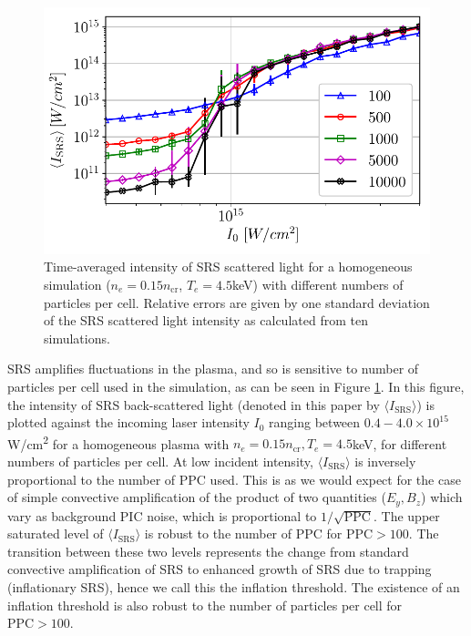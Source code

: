 \begin{figure}[ht]
 \centering
 \includegraphics[width=\columnwidth]{Chapters/C4_iSRS/fig1.pdf}
 \caption{Time-averaged intensity of SRS scattered light for a homogeneous simulation ($n_e=0.15n_\mathrm{cr}$, $T_e = 4.5$\si{\kilo \electronvolt}) with different numbers of particles
 per cell. Relative errors are given by one standard deviation of the SRS scattered light intensity as calculated from ten simulations.} \label{fig:convergence}
\end{figure}

SRS amplifies fluctuations in the plasma, and so is sensitive to number of particles per cell used in the simulation, as can be seen in Figure \ref{fig:convergence}.
In this figure, the intensity of SRS back-scattered light (denoted in this paper by $\langle I_{\mathrm{SRS}}\rangle$) is plotted against the incoming laser intensity $I_0$ ranging between
$0.4 - 4.0 \times 10^{15}$\si{W/\centi\metre^2} for a homogeneous plasma with $n_e=0.15n_\mathrm{cr}, T_e = 4.5$\si{\kilo \electronvolt}, for different numbers of
particles per cell.
At low incident intensity, $\langle I_{\mathrm{SRS}}\rangle$ is inversely proportional to the number of PPC used. This is as we
would expect for the case of simple convective amplification \cite{Rosenbluth1972} of the product of two quantities ($E_y,B_z$) which vary as background PIC noise, which is proportional to $1/\sqrt{\mathrm{PPC}}$.
The upper saturated level of  $\langle I_{\mathrm{SRS}}\rangle$ is robust to the number of PPC for $\mathrm{PPC} > 100$.
The transition between these two levels represents the change from standard convective amplification of SRS to enhanced
growth of SRS due to trapping (inflationary SRS), hence we call this the inflation threshold.
The existence of an inflation threshold is also robust to the number of particles per cell for $\mathrm{PPC} > 100$.


